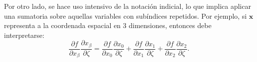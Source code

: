 Por otro lado, se hace uso intensivo de la notaci\'on indicial, lo que implica aplicar una sumatoria sobre aquellas variables con sub\'indices repetidos. Por ejemplo, si $\bm{x}$ representa a la coordenada espacial en 3 dimensiones, entonces debe interpretarse:
\begin{equation}
	\dfrac{\partial f}{\partial x_{\beta}}\dfrac{\partial x_{\beta}}{\partial \zeta} = \dfrac{\partial f}{\partial x_{0}}\dfrac{\partial x_{0}}{\partial \zeta} + \dfrac{\partial f}{\partial x_{1}}\dfrac{\partial x_{1}}{\partial \zeta} + \dfrac{\partial f}{\partial x_{2}}\dfrac{\partial x_{2}}{\partial \zeta}.
\end{equation}